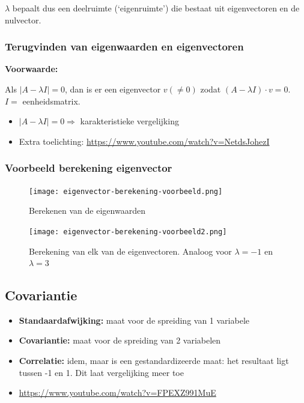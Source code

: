 \documentclass{article}
\begin{document}
$\lambda$ bepaalt dus een deelruimte (`eigenruimte') die bestaat uit eigenvectoren en de nulvector.

\subsubsection{Terugvinden van eigenwaarden en eigenvectoren}

\textbf{Voorwaarde:}

Als $|A - \lambda I| = 0$, dan is er een eigenvector $v (\neq 0)$ 
zodat $(A - \lambda I) \cdot v = 0$. $I =$ eenheidsmatrix.

\begin{itemize}
    \item $|A - \lambda I| = 0 \Rightarrow$ karakteristieke vergelijking 
    \item Extra toelichting: \url{https://www.youtube.com/watch?v=NetdsJohezI}
\end{itemize}

\subsubsection{Voorbeeld berekening eigenvector}

\begin{figure}[H]
    \centering
    \texttt{[image: eigenvector-berekening-voorbeeld.png]}
    \caption{Berekenen van de eigenwaarden}
\end{figure}

\begin{figure}[H]
    \centering
    \texttt{[image: eigenvector-berekening-voorbeeld2.png]}
    \caption{Berekening van elk van de eigenvectoren. Analoog voor $\lambda = -1$ en $\lambda = 3$}
\end{figure}

\subsection{Covariantie}

\begin{itemize}
    \item \textbf{Standaardafwijking:} maat voor de spreiding van 1 variabele
    \item \textbf{Covariantie:} maat voor de spreiding van 2 variabelen
    \item \textbf{Correlatie:} idem, maar is een gestandardizeerde maat: het resultaat ligt tussen -1 en 1. Dit laat vergelijking meer toe
    \item \url{https://www.youtube.com/watch?v=FPEXZ991MuE}
\end{itemize}
\end{document}
